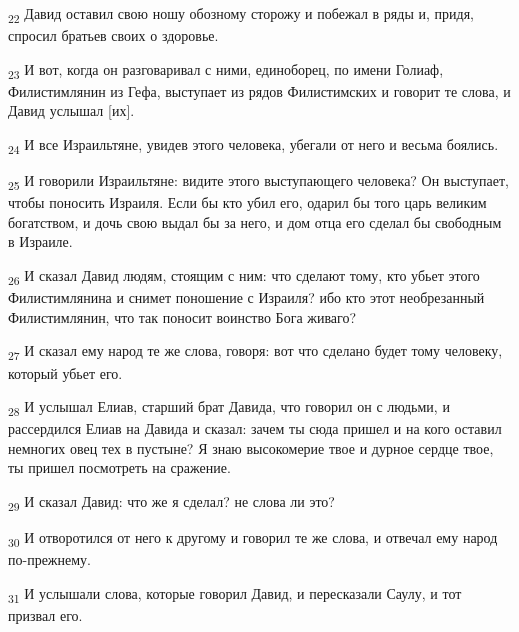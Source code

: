 \begin{tcolorbox}
\textsubscript{22} Давид оставил свою ношу обозному сторожу и побежал в ряды и, придя, спросил братьев своих о здоровье.
\end{tcolorbox}
\begin{tcolorbox}
\textsubscript{23} И вот, когда он разговаривал с ними, единоборец, по имени Голиаф, Филистимлянин из Гефа, выступает из рядов Филистимских и говорит те слова, и Давид услышал [их].
\end{tcolorbox}
\begin{tcolorbox}
\textsubscript{24} И все Израильтяне, увидев этого человека, убегали от него и весьма боялись.
\end{tcolorbox}
\begin{tcolorbox}
\textsubscript{25} И говорили Израильтяне: видите этого выступающего человека? Он выступает, чтобы поносить Израиля. Если бы кто убил его, одарил бы того царь великим богатством, и дочь свою выдал бы за него, и дом отца его сделал бы свободным в Израиле.
\end{tcolorbox}
\begin{tcolorbox}
\textsubscript{26} И сказал Давид людям, стоящим с ним: что сделают тому, кто убьет этого Филистимлянина и снимет поношение с Израиля? ибо кто этот необрезанный Филистимлянин, что так поносит воинство Бога живаго?
\end{tcolorbox}
\begin{tcolorbox}
\textsubscript{27} И сказал ему народ те же слова, говоря: вот что сделано будет тому человеку, который убьет его.
\end{tcolorbox}
\begin{tcolorbox}
\textsubscript{28} И услышал Елиав, старший брат Давида, что говорил он с людьми, и рассердился Елиав на Давида и сказал: зачем ты сюда пришел и на кого оставил немногих овец тех в пустыне? Я знаю высокомерие твое и дурное сердце твое, ты пришел посмотреть на сражение.
\end{tcolorbox}
\begin{tcolorbox}
\textsubscript{29} И сказал Давид: что же я сделал? не слова ли это?
\end{tcolorbox}
\begin{tcolorbox}
\textsubscript{30} И отворотился от него к другому и говорил те же слова, и отвечал ему народ по-прежнему.
\end{tcolorbox}
\begin{tcolorbox}
\textsubscript{31} И услышали слова, которые говорил Давид, и пересказали Саулу, и тот призвал его.
\end{tcolorbox}
